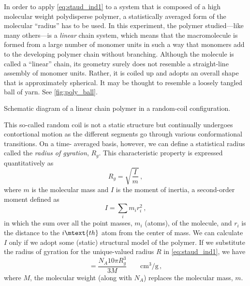 \documentclass[nobib,nofonts,nols,nohyper]{tufte-handout}
\begin{document}
In order to apply \cref{eq:staud_ind1} to a system that is composed of a high molecular weight polydisperse polymer, a statistically averaged form of the molecular ``radius'' has to be used. 
In this experiment, the polymer studied---like many others---is a \emph{linear} chain system, which means that the macromolecule is formed from a large number of monomer units in such a way that monomers add to the developing polymer chain without branching. 
Although the molecule is called a ``linear'' chain, its geometry surely does not resemble a straight-line assembly of monomer units. 
Rather, it is coiled up and adopts an overall shape that is approximately spherical. It may be thought to resemble a loosely tangled ball of yarn. See \cref{fig:poly_ball}.
\begin{marginfigure}
	\caption{Schematic diagram of a linear chain polymer in a random-coil configuration.}
	\label{fig:poly_ball}
\end{marginfigure}
This so-called random coil is not a static structure but continually undergoes contortional motion as the different segments go through various conformational transitions. 
On a time- averaged basis, however, we can define a statistical radius called the \emph{radius of gyration}, \( R_g \). 
This characteristic property is expressed quantitatively as
\begin{equation}
	R_g = \sqrt{\frac{I}{m}} \, ,
	\label{eq:rad_gyr}
\end{equation}
where \( m \) is the molecular mass and \( I \) is the moment of inertia, a second-order moment defined as
\begin{equation}
	I = \sum_i m_i r_i^2 \, ,
	\label{eq:mom_inert}
\end{equation}
in which the sum over all the point masses, \( m_i \) (atoms), of the molecule, and \( r_i \) is the distance to the \( i\mtext{th} \) atom from the center of mass. 
We can calculate \( I \) only if we adopt some (static) structural model of the polymer. 
If we substitute the radius of gyration for the unique-valued radius \( R \) in \cref{eq:staud_ind1}, we have
\begin{equation}
	[\eta] = \frac{N_A 10 \pi R_g^3}{3 M} \qquad \si{\cm\cubed \per \g} \, ,
	\label{eq:staud_ind2}
\end{equation}
where \( M \), the molecular weight (along with \( N_A \)) replaces the molecular mass, \( m \).
\end{document}
